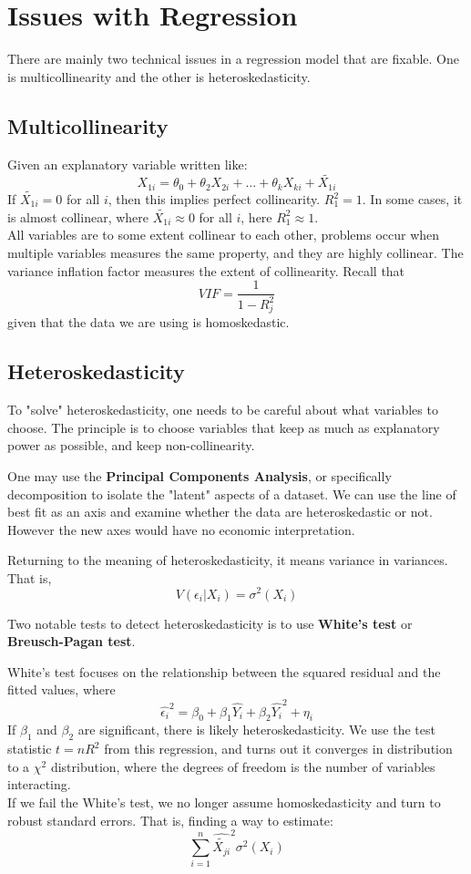 \section{Issues with Regression}
There are mainly two technical issues in a regression model that are fixable. One is multicollinearity and the other is heteroskedasticity.

\subsection{Multicollinearity}
Given an explanatory variable written like:
$$X_{1i} = \theta_0 + \theta_2 X_{2i} + \dots + \theta_k X_{ki} + \tilde{X_{1i}}$$
If $\tilde{X_{1i}} = 0$ for all $i$, then this implies perfect collinearity. $R_1^2 = 1$. In some cases, it is almost collinear, where $\tilde{X_{1i}} \approx 0$ for all $i$, here $R_1^2 \approx 1$. \\
All variables are to some extent collinear to each other, problems occur when multiple variables measures the same property, and they are highly collinear. The variance inflation factor measures the extent of collinearity. Recall that
$$VIF = \frac{1}{1-R_j^2}$$
given that the data we are using is homoskedastic.

\subsection{Heteroskedasticity}
To "solve" heteroskedasticity, one needs to be careful about what variables to choose. The principle is to choose variables that keep as much as explanatory power as possible, and keep non-collinearity.

One may use the \textbf{Principal Components Analysis}, or specifically decomposition to isolate the "latent" aspects of a dataset. We can use the line of best fit as an axis and examine whether the data are heteroskedastic or not. However the new axes would have no economic interpretation.

Returning to the meaning of heteroskedasticity, it means variance in variances. That is,
$$V(\epsilon_i | X_i) = \sigma^2(X_i)$$

Two notable tests to detect heteroskedasticity is to use \textbf{White's test} or \textbf{Breusch-Pagan test}.

White's test focuses on the relationship between the squared residual and the fitted values, where
$$\hat{\epsilon_i}^2 = \beta_0 + \beta_1 \hat{Y_i} + \beta_2 \hat{Y_i}^2 + \eta_i$$
If $\beta_1$ and $\beta_2$ are significant, there is likely heteroskedasticity. We use the test statistic $t = nR^2$ from this regression, and turns out it converges in distribution to a $\chi^2$ distribution, where the degrees of freedom is the number of variables interacting. \\
If we fail the White's test, we no longer assume homoskedasticity and turn to robust standard errors. That is, finding a way to estimate:
$$\sum_{i=1}^{n} \hat{\tilde{X_{ji}}}^2 \sigma^2(X_i)$$

